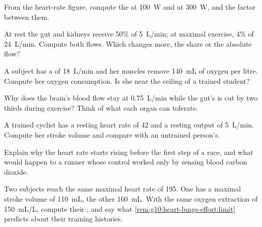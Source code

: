 \begin{exercise}[$\star\star$]\label{exo:g10:heart-lungs-effort:6}
From the heart-rate figure, compute the  at \qty{100}{W}
and at \qty{300}{W}, and the factor between them.
\end{exercise}

\begin{exercise}[$\star\star$]\label{exo:g10:heart-lungs-effort:7}
At rest the gut and kidneys receive 50\% of \qty{5}{L/min}; at maximal
exercise, 4\% of \qty{24}{L/min}. Compute both flows. Which changes
more, the share or the absolute flow?
\end{exercise}

\begin{exercise}[$\star\star$]\label{exo:g10:heart-lungs-effort:8}
A subject has a  of \qty{18}{L/min} and her muscles
remove \qty{140}{mL} of oxygen per litre. Compute her oxygen
consumption. Is she near the ceiling of a trained student?
\end{exercise}

\begin{exercise}[$\star\star$]\label{exo:g10:heart-lungs-effort:9}
Why does the brain's blood flow stay at \qty{0.75}{L/min} while the
gut's is cut by two thirds during exercise? Think of what each organ
can tolerate.
\end{exercise}

\begin{exercise}[$\star\star$]\label{exo:g10:heart-lungs-effort:10}
A trained cyclist has a resting heart rate of 42 and a resting output
of \qty{5}{L/min}. Compute her stroke volume and compare with an
untrained person's.
\end{exercise}

\begin{exercise}[$\star\star$]\label{exo:g10:heart-lungs-effort:11}
Explain why the heart rate starts rising before the first step of a
race, and what would happen to a runner whose control worked only by
sensing blood carbon dioxide.
\end{exercise}

\begin{exercise}[$\star\star\star$]\label{exo:g10:heart-lungs-effort:12}
Two subjects reach the same maximal heart rate of 195. One has a
maximal stroke volume of \qty{110}{mL}, the other \qty{160}{mL}. With
the same oxygen extraction of \qty{150}{mL/L}, compute their , and say what \cref{rem:g10:heart-lungs-effort:limit}
predicts about their training histories.
\end{exercise}

